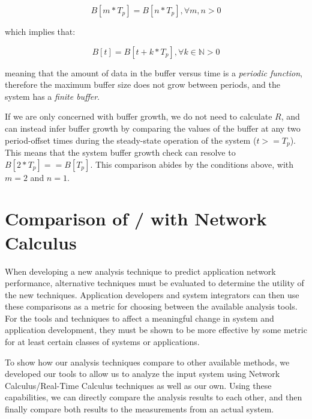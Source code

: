 \begin{equation}
   B[m*T_p] = B[n*T_p], \forall m,n > 0
\end{equation}

which implies that:

\begin{equation}
  B[t] = B[t + k*T_p], \forall k \in \mathbb{N} > 0
\end{equation}

meaning that the amount of data in the buffer versus time is a
\emph{periodic function}, therefore the maximum buffer size does not
grow between periods, and the system has a \emph{finite buffer}.

If we are only concerned with buffer growth, we do not need to
calculate $R$, and can instead infer buffer growth by comparing
the values of the buffer at any two period-offset times during the
steady-state operation of the system ($t >= T_p$).  This means
that the system buffer growth check can resolve to $B[2*T_p] ==
B[T_p]$.  This comparison abides by the conditions above, with
$m=2$ and $n=1$.

\newpage

\section{Comparison of \shorttool/ with Network Calculus}
\label{sec:comparison}

When developing a new analysis technique to predict application
network performance, alternative techniques must be evaluated to
determine the utility of the new techniques.  Application developers
and system integrators can then use these comparisons as a metric for
choosing between the available analysis tools.  For the tools and
techniques to affect a meaningful change in system and application
development, they must be shown to be more effective by some metric
for at least certain classes of systems or applications.

To show how our analysis techniques compare to other available
methods, we developed our tools to allow us to analyze the input
system using Network Calculus/Real-Time Calculus techniques as well as
our own.  Using these capabilities, we can directly compare the
analysis results to each other, and then finally compare both results
to the measurements from an actual system.

